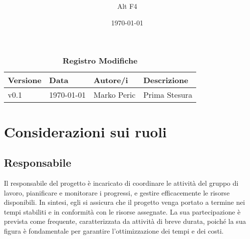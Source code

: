 \documentclass[a4paper, 12pt]{article}
\title{\Huge \textbf{\titolo}}
\author{\Large{Alt} \raisebox{0.3ex}{\normalsize  +} \Large{F4}}
\date{\today}
\def\logo{../Immagini/logo.jpeg}
\def\ultima-versione{v0.1}
\begin{document}
\begin{titlepage}      
    \maketitle
    \thispagestyle{empty}  

\end{titlepage}
\tableofcontents

\newpage

\begin{table}[!h]
    \centering
    \caption*{\textbf{\Large Registro Modifiche}}
    {\renewcommand{\arraystretch}{2}
    \begin{tabularx}{\textwidth}{| X | X | X | X |}
        \hline
            \textbf{\large Versione} & 
            \textbf{\large Data} & 
            \textbf{\large Autore/i} & 
            \textbf{\large Descrizione} \\ 
        \hline \hline
            \ultima-versione & 
            \today & 
            Marko Peric & 
            Prima Stesura \\
        \hline 
    \end{tabularx}}
\end{table}

\newpage

\section{Considerazioni sui ruoli}
\subsection{Responsabile}
Il responsabile del progetto è incaricato di coordinare le attività del gruppo di lavoro, pianificare e monitorare i progressi, e gestire efficacemente le risorse disponibili. 
In sintesi, egli si assicura che il progetto venga portato a termine nei tempi stabiliti e in conformità con le risorse assegnate. La sua partecipazione è prevista come frequente, caratterizzata da attività di breve durata,
poiché la sua figura è fondamentale per garantire l’ottimizzazione dei tempi e dei costi.
\end{document}
